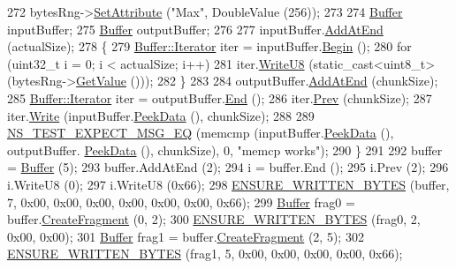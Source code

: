 \begin{DoxyCode}
272     bytesRng->\hyperlink{classns3_1_1ObjectBase_ac60245d3ea4123bbc9b1d391f1f6592f}{SetAttribute} (\textcolor{stringliteral}{"Max"}, DoubleValue (256));
273 
274     \hyperlink{classns3_1_1Buffer}{Buffer} inputBuffer;
275     \hyperlink{classns3_1_1Buffer}{Buffer} outputBuffer;
276 
277     inputBuffer.\hyperlink{classns3_1_1Buffer_a92dd87809af24fb10696fee9a9cb56cf}{AddAtEnd} (actualSize);
278     \{
279       \hyperlink{classns3_1_1Buffer_1_1Iterator}{Buffer::Iterator} iter = inputBuffer.\hyperlink{classns3_1_1Buffer_a893d4bf50df13e730b6cd0fda91b967f}{Begin} ();
280       \textcolor{keywordflow}{for} (uint32\_t i = 0; i < actualSize; i++)
281         iter.\hyperlink{classns3_1_1Buffer_1_1Iterator_a3c7bacca6cbb821c9d14fa4626b7ae16}{WriteU8} (static\_cast<uint8\_t> (bytesRng->\hyperlink{classns3_1_1UniformRandomVariable_a03822d8c86ac51e9aa83bbc73041386b}{GetValue} ()));
282     \}
283 
284     outputBuffer.\hyperlink{classns3_1_1Buffer_a92dd87809af24fb10696fee9a9cb56cf}{AddAtEnd} (chunkSize);
285     \hyperlink{classns3_1_1Buffer_1_1Iterator}{Buffer::Iterator} iter = outputBuffer.\hyperlink{classns3_1_1Buffer_a52207c7aed7bae89fba2f9e997c82724}{End} ();
286     iter.\hyperlink{classns3_1_1Buffer_1_1Iterator_a9913fb3b506a9f6efe46060531f051d8}{Prev} (chunkSize);
287     iter.\hyperlink{classns3_1_1Buffer_1_1Iterator_a087b4e6b5d038544c750c741e8932d69}{Write} (inputBuffer.\hyperlink{classns3_1_1Buffer_a07800b41f95ec9c5bfdfae624b9351b0}{PeekData} (), chunkSize);
288 
289     \hyperlink{group__testing_ga7304ba46a28d8cf08dfdfd6499cf7068}{NS\_TEST\_EXPECT\_MSG\_EQ} (memcmp (inputBuffer.\hyperlink{classns3_1_1Buffer_a07800b41f95ec9c5bfdfae624b9351b0}{PeekData} (), outputBuffer.
      \hyperlink{classns3_1_1Buffer_a07800b41f95ec9c5bfdfae624b9351b0}{PeekData} (), chunkSize), 0, \textcolor{stringliteral}{"memcp works"});
290   \}
291 
292   buffer = \hyperlink{classns3_1_1Buffer}{Buffer} (5);
293   buffer.AddAtEnd (2);
294   i = buffer.End ();
295   i.Prev (2);
296   i.WriteU8 (0);
297   i.WriteU8 (0x66);
298   \hyperlink{buffer-test_8cc_adb8db1b0f6eec9da1f9f6d8b9f1e4ba8}{ENSURE\_WRITTEN\_BYTES} (buffer, 7, 0x00, 0x00, 0x00, 0x00, 0x00, 0x00, 0x66);
299   \hyperlink{classns3_1_1Buffer}{Buffer} frag0 = buffer.\hyperlink{classns3_1_1Buffer_a9285016f38b451c65edb50196ef817f8}{CreateFragment} (0, 2);
300   \hyperlink{buffer-test_8cc_adb8db1b0f6eec9da1f9f6d8b9f1e4ba8}{ENSURE\_WRITTEN\_BYTES} (frag0, 2, 0x00, 0x00);
301   \hyperlink{classns3_1_1Buffer}{Buffer} frag1 = buffer.\hyperlink{classns3_1_1Buffer_a9285016f38b451c65edb50196ef817f8}{CreateFragment} (2, 5);
302   \hyperlink{buffer-test_8cc_adb8db1b0f6eec9da1f9f6d8b9f1e4ba8}{ENSURE\_WRITTEN\_BYTES} (frag1, 5, 0x00, 0x00, 0x00, 0x00, 0x66);

\end{DoxyCode}
